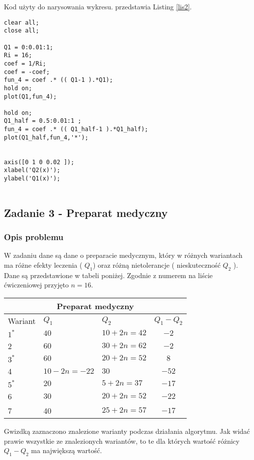 \documentclass[a4paper,15pt]{article}
\begin{document}
Kod użyty do narysowania wykresu. przedstawia Listing \ref{lis2}.
\begin{lstlisting}[caption=Wykres ze zbiorem punktów kompromisowych, captionpos=b,label=lis2, firstnumber=1,frame=single]
clear all;
close all;

Q1 = 0:0.01:1;
Ri = 16;
coef = 1/Ri;
coef = -coef;
fun_4 = coef .* (( Q1-1 ).*Q1);
hold on;
plot(Q1,fun_4);

hold on;
Q1_half = 0.5:0.01:1 ;
fun_4 = coef .* (( Q1_half-1 ).*Q1_half);
plot(Q1_half,fun_4,'*');


axis([0 1 0 0.02 ]);
xlabel('Q2(x)');
ylabel('Q1(x)');


\end{lstlisting}

\subsection{Zadanie 3 - Preparat medyczny}
\subsubsection{Opis problemu}
W zadaniu dane są dane o preparacie medycznym, który w różnych wariantach ma różne efekty leczenia ( \(Q_{1}\)) oraz różną nietolerancje ( nieskuteczność \( Q_{2}\) ). Dane są przedstawione w tabeli poniżej. Zgodnie z numerem na liście ćwiczeniowej przyjęto \( n = 16 \). \\
\begin{table}[H]
\begin{center}
\begin{tabular}{|l|l|l|c|}
\hline
\multicolumn{4}{|c|}{\textbf{Preparat medyczny}} \\ \hline 
Wariant & \(Q_{1}\) & \(Q_{2}\) & \(Q_{1}-Q_{2}\) \\ \hline
\(1^{*}\) & \( 40 \) & \( 10+2n=42 \) & \(-2\)\\ \hline 
2 & \( 60 \) & \( 30+2n=62 \) & \(-2\)\\ \hline 
\(3^{*}\) & \( 60 \) & \( 20+2n=52 \) & \(8\)\\ \hline 
4 & \( 10-2n=-22\) & \(30 \) & \(-52\) \\ \hline 
\(5^{*}\) & \( 20 \) & \( 5+2n=37\) & \( -17\) \\ \hline 
6 & \(30\) & \(20+2n=52\) & \( -22 \)\\ \hline 
7 & 40 & \(25+2n=57\) & \(-17\)\\ \hline 
\end{tabular}
\end{center}
\end{table}
Gwizdką zaznaczono znalezione warianty podczas działania algorytmu. Jak widać prawie wszystkie ze znalezionych wariantów, to te dla których wartość różnicy \( Q_{1}-Q_{2}\) ma największą wartość.
\end{document}
